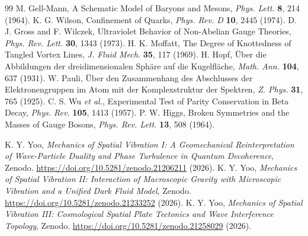\documentclass[reprint,amsmath,amssymb,aps,prd]{revtex4-2}
\begin{document}
\begin{thebibliography}{99}
 M. Gell-Mann, A Schematic Model of Baryons and Mesons, \textit{Phys. Lett.} \textbf{8}, 214 (1964).
 K. G. Wilson, Confinement of Quarks, \textit{Phys. Rev. D} \textbf{10}, 2445 (1974).
 D. J. Gross and F. Wilczek, Ultraviolet Behavior of Non-Abelian Gauge Theories, \textit{Phys. Rev. Lett.} \textbf{30}, 1343 (1973).
 H. K. Moffatt, The Degree of Knottedness of Tangled Vortex Lines, \textit{J. Fluid Mech.} \textbf{35}, 117 (1969).
 H. Hopf, \"{U}ber die Abbildungen der dreidimensionalen Sph\"{a}re auf die Kugelfl\"{a}che, \textit{Math. Ann.} \textbf{104}, 637 (1931).
 W. Pauli, \"{U}ber den Zusammenhang des Abschlusses der Elektronengruppen im Atom mit der Komplexstruktur der Spektren, \textit{Z. Phys.} \textbf{31}, 765 (1925).
 C. S. Wu \textit{et al.}, Experimental Test of Parity Conservation in Beta Decay, \textit{Phys. Rev.} \textbf{105}, 1413 (1957).
 P. W. Higgs, Broken Symmetries and the Masses of Gauge Bosons, \textit{Phys. Rev. Lett.} \textbf{13}, 508 (1964).

 K. Y. Yoo, \textit{Mechanics of Spatial Vibration I: A Geomechanical Reinterpretation of Wave-Particle Duality and Phase Turbulence in Quantum Decoherence}, Zenodo. \url{https://doi.org/10.5281/zenodo.21206211} (2026).
 K. Y. Yoo, \textit{Mechanics of Spatial Vibration II: Interaction of Macroscopic Gravity with Microscopic Vibration and a Unified Dark Fluid Model}, Zenodo. \url{https://doi.org/10.5281/zenodo.21233252} (2026).
 K. Y. Yoo, \textit{Mechanics of Spatial Vibration III: Cosmological Spatial Plate Tectonics and Wave Interference Topology}, Zenodo. \url{https://doi.org/10.5281/zenodo.21258029} (2026).
\end{thebibliography}
\end{document}
